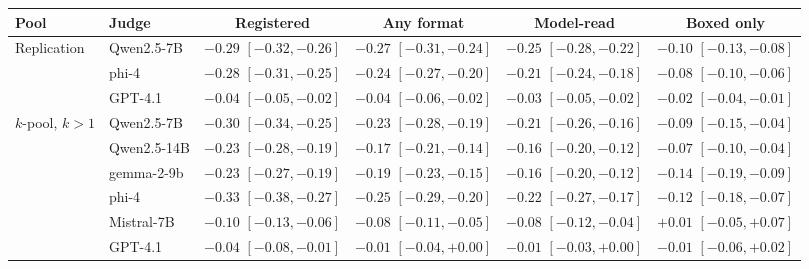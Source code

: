 \begin{tabular}{llcccc}
\toprule
Pool & Judge & Registered & Any format & Model-read & Boxed only \\
\midrule
Replication & Qwen2.5-7B & $-0.29$ {\scriptsize$[-0.32,-0.26]$} & $-0.27$ {\scriptsize$[-0.31,-0.24]$} & $-0.25$ {\scriptsize$[-0.28,-0.22]$} & $-0.10$ {\scriptsize$[-0.13,-0.08]$} \\
 & phi-4 & $-0.28$ {\scriptsize$[-0.31,-0.25]$} & $-0.24$ {\scriptsize$[-0.27,-0.20]$} & $-0.21$ {\scriptsize$[-0.24,-0.18]$} & $-0.08$ {\scriptsize$[-0.10,-0.06]$} \\
 & GPT-4.1 & $-0.04$ {\scriptsize$[-0.05,-0.02]$} & $-0.04$ {\scriptsize$[-0.06,-0.02]$} & $-0.03$ {\scriptsize$[-0.05,-0.02]$} & $-0.02$ {\scriptsize$[-0.04,-0.01]$} \\
\addlinespace
$k$-pool, $k{>}1$ & Qwen2.5-7B & $-0.30$ {\scriptsize$[-0.34,-0.25]$} & $-0.23$ {\scriptsize$[-0.28,-0.19]$} & $-0.21$ {\scriptsize$[-0.26,-0.16]$} & $-0.09$ {\scriptsize$[-0.15,-0.04]$} \\
 & Qwen2.5-14B & $-0.23$ {\scriptsize$[-0.28,-0.19]$} & $-0.17$ {\scriptsize$[-0.21,-0.14]$} & $-0.16$ {\scriptsize$[-0.20,-0.12]$} & $-0.07$ {\scriptsize$[-0.10,-0.04]$} \\
 & gemma-2-9b & $-0.23$ {\scriptsize$[-0.27,-0.19]$} & $-0.19$ {\scriptsize$[-0.23,-0.15]$} & $-0.16$ {\scriptsize$[-0.20,-0.12]$} & $-0.14$ {\scriptsize$[-0.19,-0.09]$} \\
 & phi-4 & $-0.33$ {\scriptsize$[-0.38,-0.27]$} & $-0.25$ {\scriptsize$[-0.29,-0.20]$} & $-0.22$ {\scriptsize$[-0.27,-0.17]$} & $-0.12$ {\scriptsize$[-0.18,-0.07]$} \\
 & Mistral-7B & $-0.10$ {\scriptsize$[-0.13,-0.06]$} & $-0.08$ {\scriptsize$[-0.11,-0.05]$} & $-0.08$ {\scriptsize$[-0.12,-0.04]$} & $+0.01$ {\scriptsize$[-0.05,+0.07]$} \\
 & GPT-4.1 & $-0.04$ {\scriptsize$[-0.08,-0.01]$} & $-0.01$ {\scriptsize$[-0.04,+0.00]$} & $-0.01$ {\scriptsize$[-0.03,+0.00]$} & $-0.01$ {\scriptsize$[-0.06,+0.02]$} \\
\bottomrule
\end{tabular}
